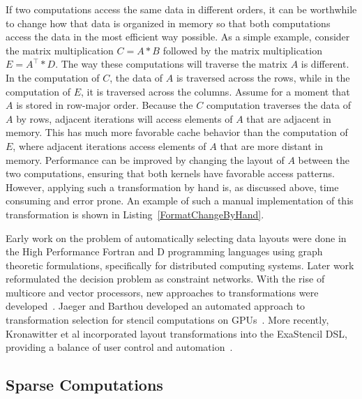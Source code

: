 If two computations access the same data in different orders, it can be worthwhile to change how that data is organized in memory so that both computations access the data in the most efficient way possible.
As a simple example, consider the matrix multiplication $C = A * B$ followed by the matrix multiplication $E = A^{\top} * D$. 
The way these computations will traverse the matrix $A$ is different. 
In the computation of $C$, the data of $A$ is traversed across the rows, while in the computation of $E$, it is traversed across the columns.
Assume for a moment that $A$ is stored in row-major order.
Because the $C$ computation traverses the data of $A$ by rows, adjacent iterations will access elements of $A$ that are adjacent in memory.
This has much more favorable cache behavior than the computation of $E$, where adjacent iterations access elements of $A$ that are more distant in memory.
Performance can be improved by changing the layout of $A$ between the two computations, ensuring that both kernels have favorable access patterns.
However, applying such a transformation by hand is, as discussed above, time consuming and error prone. 
An example of such a manual implementation of this transformation is shown in Listing~\ref{FormatChangeByHand}.

Early work on the problem of automatically selecting data layouts were done in the High Performance Fortran and D programming languages using graph theoretic formulations, specifically for distributed computing systems\cite{kennedy1995automatic,kennedy1998automatic}.
Later work reformulated the decision problem as constraint networks\cite{chen2005constraint}.
With the rise of multicore and vector processors, new approaches to transformations were developed~\cite{lu2009data,henretty2011data,zhang2011optimizing}.
Jaeger and Barthou developed an automated approach to transformation selection for stencil computations on GPUs~\cite{jaeger2012automatic}.
More recently, Kronawitter et al incorporated layout transformations into the ExaStencil DSL, providing a balance of user control and automation~\cite{kronawitter2018automatic}.

\subsection{Sparse Computations}


